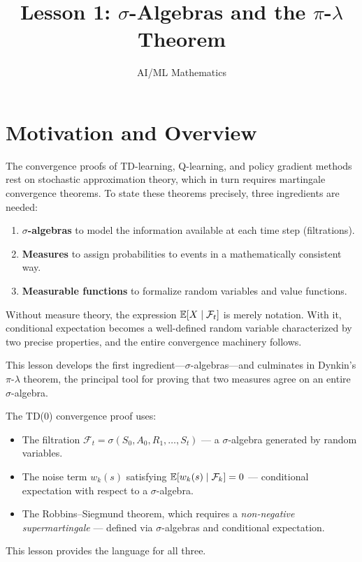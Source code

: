 \documentclass[11pt,a4paper]{article}
\title{Lesson 1: $\sigma$-Algebras and the $\pi$-$\lambda$ Theorem}
\author{AI/ML Mathematics}
\date{}
\begin{document}
\maketitle
\tableofcontents
\newpage


\section{Motivation and Overview}
\label{sec:motivation}

The convergence proofs of TD-learning, Q-learning, and policy gradient methods
rest on stochastic approximation theory, which in turn requires martingale
convergence theorems. To state these theorems precisely, three ingredients
are needed:
\begin{enumerate}[nosep]
  \item \textbf{$\sigma$-algebras} to model the information available at each
    time step (filtrations).
  \item \textbf{Measures} to assign probabilities to events in a mathematically
    consistent way.
  \item \textbf{Measurable functions} to formalize random variables and value
    functions.
\end{enumerate}

Without measure theory, the expression $\mathbb{E}[X \mid \mathcal{F}_t]$ is merely
notation. With it, conditional expectation becomes a well-defined random
variable characterized by two precise properties, and the entire convergence
machinery follows.

This lesson develops the first ingredient---$\sigma$-algebras---and
culminates in Dynkin's $\pi$-$\lambda$ theorem, the principal tool for
proving that two measures agree on an entire $\sigma$-algebra.

\begin{rlconnection}[title={Why This Matters for RL}]
The TD(0) convergence proof uses:
\begin{itemize}[nosep]
  \item The filtration $\mathcal{F}_t = \sigma(S_0, A_0, R_1, \ldots, S_t)$
    --- a $\sigma$-algebra generated by random variables.
  \item The noise term $w_k(s)$ satisfying
    $\mathbb{E}[w_k(s) \mid \mathcal{F}_k] = 0$ --- conditional expectation with
    respect to a $\sigma$-algebra.
  \item The Robbins--Siegmund theorem, which requires a
    \emph{non-negative supermartingale} --- defined via $\sigma$-algebras
    and conditional expectation.
\end{itemize}
This lesson provides the language for all three.
\end{rlconnection}
\end{document}
